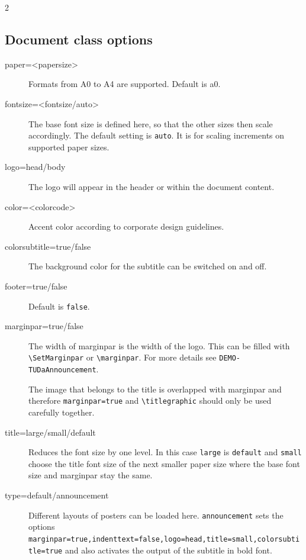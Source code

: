 \documentclass[
	english,%
	paper=a0,%
	accentcolor=9c,%
	logo=body,%
	footer=true,
]{tudaposter}
\newcommand*{\file}[1]{\texttt{#1}}
\newcommand*{\code}[1]{\texttt{#1}}
\let\tbs\textbackslash
\begin{document}
\begin{multicols}{2}
	\subsection*{Document class options}
	\begin{description}
		\item[paper=<papersize>] Formats from A0 to A4 are supported. Default is a0.
		\item[fontsize=<fontsize/auto>] The base font size is defined here, so that the other sizes then scale accordingly. The default setting is \code{auto}. It is for scaling increments on supported paper sizes.
		\item[logo=head/body] The logo will appear in the header or within the document content.
		\item[color=<colorcode>] Accent color according to corporate design guidelines.
		\item[colorsubtitle=true/false] The background color for the subtitle can be switched on and off.
		\item[footer=true/false] Default is \code{false}.
		\item[marginpar=true/false] The width of marginpar is the width of the logo. This can be filled with \code{\tbs{}SetMarginpar} or \code{\tbs{}marginpar}. For more details see \file{DEMO-TUDaAnnouncement}.

		      The image that belongs to the title is overlapped with marginpar and therefore \code{marginpar=true} and \code{\tbs{}titlegraphic} should only be used carefully together.
		\item[title=large/small/default] Reduces the font size by one level. In this case \code{large} is \code{default} and \code{small} choose the title font size of the next smaller paper size where the base font size and marginpar stay the same.
		\item[type=default/announcement] Different layouts of posters can be loaded here.
		      \code{announcement} sets the options \code{marginpar=true,indenttext=false,logo=head,title=small,colorsubtitle=true} and also activates the output of the subtitle in bold font.
	\end{description}
\end{multicols}
\end{document}
